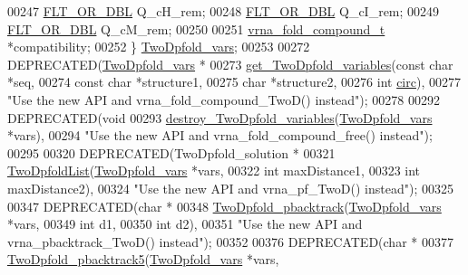 \begin{DoxyCode}
00247   \hyperlink{group__data__structures_ga31125aeace516926bf7f251f759b6126}{FLT\_OR\_DBL}            Q\_cH\_rem;
00248   \hyperlink{group__data__structures_ga31125aeace516926bf7f251f759b6126}{FLT\_OR\_DBL}            Q\_cI\_rem;
00249   \hyperlink{group__data__structures_ga31125aeace516926bf7f251f759b6126}{FLT\_OR\_DBL}            Q\_cM\_rem;
00250 
00251   \hyperlink{group__fold__compound_structvrna__fc__s}{vrna\_fold\_compound\_t}  *compatibility;
00252 \} \hyperlink{structTwoDpfold__vars}{TwoDpfold\_vars};
00253 
00272 DEPRECATED(\hyperlink{structTwoDpfold__vars}{TwoDpfold\_vars} *
00273            \hyperlink{2Dpfold_8h_a1aca740e2a75ab2b2951538266e53d64}{get\_TwoDpfold\_variables}(\textcolor{keyword}{const} \textcolor{keywordtype}{char} *seq,
00274                                    \textcolor{keyword}{const} \textcolor{keywordtype}{char} *structure1,
00275                                    \textcolor{keywordtype}{char}       *structure2,
00276                                    \textcolor{keywordtype}{int}        \hyperlink{group__model__details_gaf9202a1a09f5828dc731e2d9a10fa111}{circ}),
00277           \textcolor{stringliteral}{"Use the new API and vrna\_fold\_compound\_TwoD() instead"});
00278 
00292 DEPRECATED(\textcolor{keywordtype}{void}
00293            \hyperlink{2Dpfold_8h_afe994291458ee2ac34d3eb825ef62a15}{destroy\_TwoDpfold\_variables}(\hyperlink{structTwoDpfold__vars}{TwoDpfold\_vars} *vars),
00294            \textcolor{stringliteral}{"Use the new API and vrna\_fold\_compound\_free() instead"});
00295 
00320 DEPRECATED(TwoDpfold\_solution *
00321            \hyperlink{2Dpfold_8h_a692243dac482a1e158a8e1b7881cfda2}{TwoDpfoldList}(\hyperlink{structTwoDpfold__vars}{TwoDpfold\_vars} *vars,
00322                          \textcolor{keywordtype}{int}            maxDistance1,
00323                          \textcolor{keywordtype}{int}            maxDistance2),
00324           \textcolor{stringliteral}{"Use the new API and vrna\_pf\_TwoD() instead"});
00325 
00347 DEPRECATED(\textcolor{keywordtype}{char} *
00348            \hyperlink{2Dpfold_8h_ae251288f50dd4ae7d315af0085775f71}{TwoDpfold\_pbacktrack}(\hyperlink{structTwoDpfold__vars}{TwoDpfold\_vars}  *vars,
00349                                 \textcolor{keywordtype}{int}             d1,
00350                                 \textcolor{keywordtype}{int}             d2),
00351           \textcolor{stringliteral}{"Use the new API and vrna\_pbacktrack\_TwoD() instead"});
00352 
00376 DEPRECATED(\textcolor{keywordtype}{char} *
00377            \hyperlink{2Dpfold_8h_a13430ac6a7f90df426774f131647d2c7}{TwoDpfold\_pbacktrack5}(\hyperlink{structTwoDpfold__vars}{TwoDpfold\_vars} *vars,

\end{DoxyCode}
